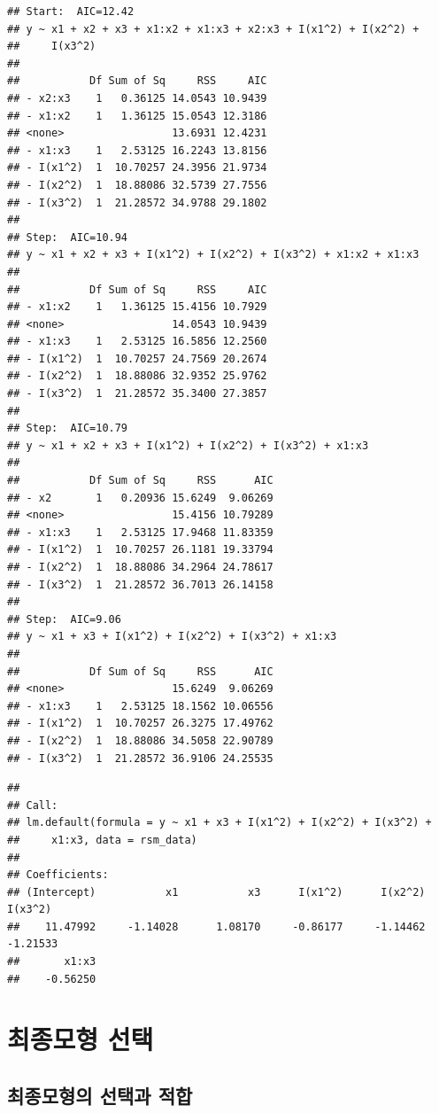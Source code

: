 \documentclass[
]{book}
\theoremstyle{definition}
\theoremstyle{definition}
\theoremstyle{definition}
\theoremstyle{definition}
\theoremstyle{remark}
\begin{document}
\begin{verbatim}
## Start:  AIC=12.42
## y ~ x1 + x2 + x3 + x1:x2 + x1:x3 + x2:x3 + I(x1^2) + I(x2^2) + 
##     I(x3^2)
## 
##           Df Sum of Sq     RSS     AIC
## - x2:x3    1   0.36125 14.0543 10.9439
## - x1:x2    1   1.36125 15.0543 12.3186
## <none>                 13.6931 12.4231
## - x1:x3    1   2.53125 16.2243 13.8156
## - I(x1^2)  1  10.70257 24.3956 21.9734
## - I(x2^2)  1  18.88086 32.5739 27.7556
## - I(x3^2)  1  21.28572 34.9788 29.1802
## 
## Step:  AIC=10.94
## y ~ x1 + x2 + x3 + I(x1^2) + I(x2^2) + I(x3^2) + x1:x2 + x1:x3
## 
##           Df Sum of Sq     RSS     AIC
## - x1:x2    1   1.36125 15.4156 10.7929
## <none>                 14.0543 10.9439
## - x1:x3    1   2.53125 16.5856 12.2560
## - I(x1^2)  1  10.70257 24.7569 20.2674
## - I(x2^2)  1  18.88086 32.9352 25.9762
## - I(x3^2)  1  21.28572 35.3400 27.3857
## 
## Step:  AIC=10.79
## y ~ x1 + x2 + x3 + I(x1^2) + I(x2^2) + I(x3^2) + x1:x3
## 
##           Df Sum of Sq     RSS      AIC
## - x2       1   0.20936 15.6249  9.06269
## <none>                 15.4156 10.79289
## - x1:x3    1   2.53125 17.9468 11.83359
## - I(x1^2)  1  10.70257 26.1181 19.33794
## - I(x2^2)  1  18.88086 34.2964 24.78617
## - I(x3^2)  1  21.28572 36.7013 26.14158
## 
## Step:  AIC=9.06
## y ~ x1 + x3 + I(x1^2) + I(x2^2) + I(x3^2) + x1:x3
## 
##           Df Sum of Sq     RSS      AIC
## <none>                 15.6249  9.06269
## - x1:x3    1   2.53125 18.1562 10.06556
## - I(x1^2)  1  10.70257 26.3275 17.49762
## - I(x2^2)  1  18.88086 34.5058 22.90789
## - I(x3^2)  1  21.28572 36.9106 24.25535
\end{verbatim}

\begin{verbatim}
## 
## Call:
## lm.default(formula = y ~ x1 + x3 + I(x1^2) + I(x2^2) + I(x3^2) + 
##     x1:x3, data = rsm_data)
## 
## Coefficients:
## (Intercept)           x1           x3      I(x1^2)      I(x2^2)      I(x3^2)  
##    11.47992     -1.14028      1.08170     -0.86177     -1.14462     -1.21533  
##       x1:x3  
##    -0.56250
\end{verbatim}

\hypertarget{uxcd5cuxc885uxbaa8uxd615-uxc120uxd0dd}{%
\section{최종모형 선택}\label{uxcd5cuxc885uxbaa8uxd615-uxc120uxd0dd}}

\hypertarget{uxcd5cuxc885uxbaa8uxd615uxc758-uxc120uxd0dduxacfc-uxc801uxd569}{%
\subsection{최종모형의 선택과 적합}\label{uxcd5cuxc885uxbaa8uxd615uxc758-uxc120uxd0dduxacfc-uxc801uxd569}}
\end{document}
